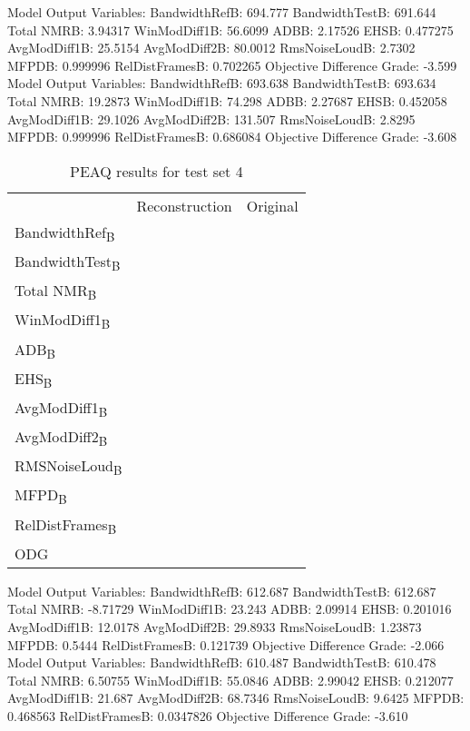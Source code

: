 Model Output Variables:
   BandwidthRefB: 694.777
  BandwidthTestB: 691.644
      Total NMRB: 3.94317
    WinModDiff1B: 56.6099
            ADBB: 2.17526
            EHSB: 0.477275
    AvgModDiff1B: 25.5154
    AvgModDiff2B: 80.0012
   RmsNoiseLoudB: 2.7302
           MFPDB: 0.999996
  RelDistFramesB: 0.702265
Objective Difference Grade: -3.599
Model Output Variables:
   BandwidthRefB: 693.638
  BandwidthTestB: 693.634
      Total NMRB: 19.2873
    WinModDiff1B: 74.298
            ADBB: 2.27687
            EHSB: 0.452058
    AvgModDiff1B: 29.1026
    AvgModDiff2B: 131.507
   RmsNoiseLoudB: 2.8295
           MFPDB: 0.999996
  RelDistFramesB: 0.686084
Objective Difference Grade: -3.608

\begin{table}\begin{center}
\caption{PEAQ results for test set 4}
\label{tab:PEAQdata2}
\begin{tabular}{|l|c|c|}
  \hline
                                    & Reconstruction & Original \\
  BandwidthRef\textsubscript{B}     &                & \\
  BandwidthTest\textsubscript{B}    &                & \\
  Total NMR\textsubscript{B}        &                & \\
  WinModDiff1\textsubscript{B}      &                & \\
  ADB\textsubscript{B}              &                & \\
  EHS\textsubscript{B}              &                & \\
  AvgModDiff1\textsubscript{B}      &                & \\
  AvgModDiff2\textsubscript{B}      &                & \\
  RMSNoiseLoud\textsubscript{B}     &                & \\
  MFPD\textsubscript{B}             &                & \\
  RelDistFrames\textsubscript{B}    &                & \\
  ODG                               &                & \\
  \hline
\end{tabular}
\end{center}\end{table}



Model Output Variables:
   BandwidthRefB: 612.687
  BandwidthTestB: 612.687
      Total NMRB: -8.71729
    WinModDiff1B: 23.243
            ADBB: 2.09914
            EHSB: 0.201016
    AvgModDiff1B: 12.0178
    AvgModDiff2B: 29.8933
   RmsNoiseLoudB: 1.23873
           MFPDB: 0.5444
  RelDistFramesB: 0.121739
Objective Difference Grade: -2.066
Model Output Variables:
   BandwidthRefB: 610.487
  BandwidthTestB: 610.478
      Total NMRB: 6.50755
    WinModDiff1B: 55.0846
            ADBB: 2.99042
            EHSB: 0.212077
    AvgModDiff1B: 21.687
    AvgModDiff2B: 68.7346
   RmsNoiseLoudB: 9.6425
           MFPDB: 0.468563
  RelDistFramesB: 0.0347826
Objective Difference Grade: -3.610

